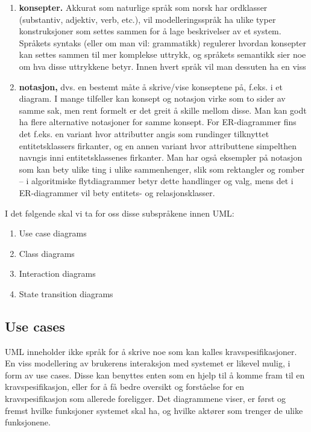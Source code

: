 \begin{enumerate}

\item
\textbf{konsepter.} Akkurat som naturlige språk som norsk har ordklasser (substantiv, adjektiv, verb, etc.), vil modelleringsspråk ha ulike typer konstruksjoner som settes sammen for å lage beskrivelser av et system. Språkets syntaks (eller om man vil: grammatikk) regulerer hvordan konsepter kan settes sammen til mer komplekse uttrykk, og språkets semantikk sier noe om hva disse uttrykkene betyr. Innen hvert språk vil man dessuten ha en viss

\item
\textbf{notasjon,} dvs. en bestemt måte å skrive/vise konseptene på, f.eks. i et diagram. I mange tilfeller kan konsept og notasjon virke som to sider av samme sak, men rent formelt er det greit å skille mellom disse. Man kan godt ha flere alternative notasjoner for samme konsept. For ER-diagrammer fins det f.eks. en variant hvor attributter angis som rundinger tilknyttet entitetsklassers firkanter, og en annen variant hvor attributtene simpelthen navngis inni entitetsklassenes firkanter. Man har også eksempler på notasjon som kan bety ulike ting i ulike sammenhenger, slik som rektangler og romber – i algoritmiske flytdiagrammer betyr dette handlinger og valg, mens det i ER-diagrammer vil bety entitets- og relasjonsklasser.

\end{enumerate}

I det følgende skal vi ta for oss disse subspråkene innen UML:

\begin{enumerate}

\item
Use case diagrams

\item
Class diagrams

\item
Interaction diagrams

\item
State transition diagrams

\end{enumerate}

\subsection{Use cases}

UML inneholder ikke språk for å skrive noe som kan kalles kravspesifikasjoner. En viss modellering av brukerens interaksjon med systemet er likevel mulig, i form av use cases. Disse kan benyttes enten som en hjelp til å komme fram til en kravspesifikasjon, eller for å få bedre oversikt og forståelse for en kravspesifikasjon som allerede foreligger. Det diagrammene viser, er først og fremst hvilke funksjoner systemet skal ha, og hvilke aktører som trenger de ulike funksjonene.


